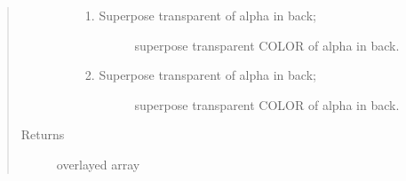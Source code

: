 \documentclass[letterpaper,10pt,english]{sphinxmanual}
\begin{document}
\begin{fulllineitems}
\begin{quote}
\begin{description}
\begin{itemize}
\begin{enumerate}
\item {} \begin{description}
\item[{Superpose transparent of alpha in back;}] \leavevmode
superpose transparent COLOR of alpha in back.

\end{description}

\item {} \begin{description}
\item[{Superpose transparent of alpha in back;}] \leavevmode
superpose transparent COLOR of alpha in back.

\end{description}

\end{enumerate}


\end{itemize}

\item[{Returns}] \leavevmode
overlayed array

\end{description}\end{quote}




{\hyperref[RRtoolbox.lib.arrayops:RRtoolbox.lib.arrayops.basic.overlay2]{\emph{}}}



\end{fulllineitems}

\end{document}
